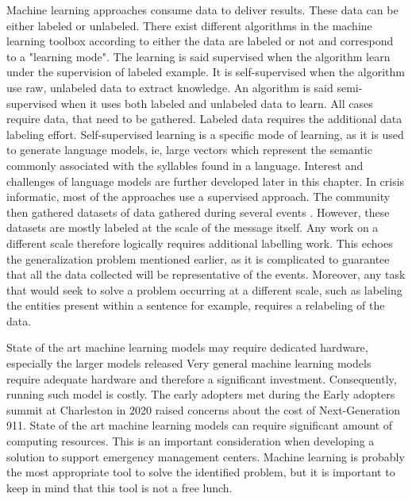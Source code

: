 Machine learning approaches consume data to deliver results.
These data can be either labeled or unlabeled.
There exist different algorithms in the machine learning toolbox according to either the
data are labeled or not and correspond to a "learning mode".
The learning is said supervised when the algorithm learn under the supervision of labeled
example.
It is self-supervised when the algorithm use raw, unlabeled data to extract knowledge.
An algorithm is said semi-supervised when it uses both labeled and unlabeled data to learn.
All cases require data, that need to be gathered.
Labeled data requires the additional data labeling effort.
Self-supervised learning is a specific mode of learning, as it is used to generate language
models, ie, large vectors which represent the semantic commonly associated with the syllables
found in a language.
Interest and challenges of language models are further developed later in this chapter.
In crisis informatic, most of the approaches use a supervised approach.
The community then gathered datasets of data gathered during several events \parencite{olteanuCrisisLexLexiconCollecting2014,olteanuWhatExpectWhen2015}.
However, these datasets are mostly labeled at the scale of the message itself.
Any work on a different scale therefore logically requires additional labelling work.
This echoes the generalization problem mentioned earlier, as it is complicated to guarantee
that all the data collected will be representative of the events.
Moreover, any task that would seek to solve a problem occurring at a different scale,
such as labeling the entities present within a sentence for example, requires a relabeling
of the data.

State of the art machine learning models may require dedicated hardware, especially the
larger models released
Very general machine learning models require adequate hardware and therefore a significant investment.
Consequently, running such model is costly.
The early adopters met during the Early adopters summit at Charleston in 2020 raised concerns
about the cost of Next-Generation 911.
State of the art machine learning models can require significant amount of computing
resources.
This is an important consideration when developing a solution to support emergency management centers.
Machine learning is probably the most appropriate tool to solve the identified problem,
but it is important to keep in mind that this tool is not a free lunch.

